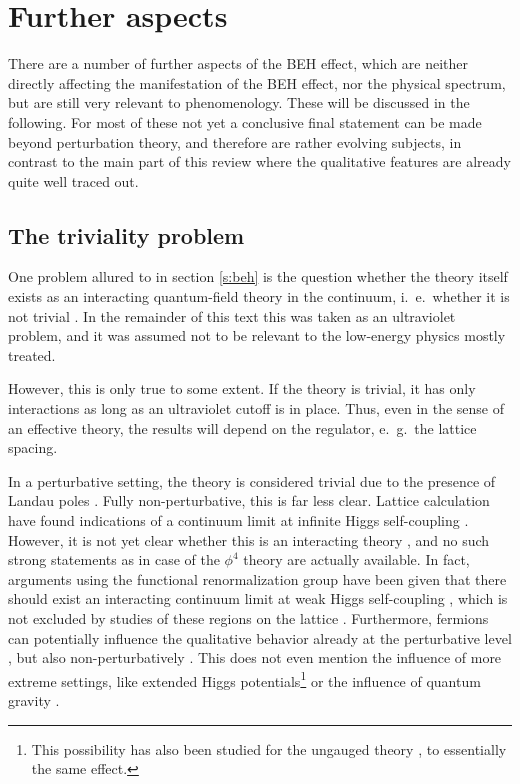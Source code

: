 \documentclass[final,twoside,12pt]{article}
\newcommand*{\1}{1\!\!\!\bot}
\begin{document}
\section{Further aspects}\label{s:further}

There are a number of further aspects of the BEH effect, which are neither directly affecting the manifestation of the BEH effect, nor the physical spectrum, but are still very relevant to phenomenology. These will be discussed in the following. For most of these not yet a conclusive final statement can be made beyond perturbation theory, and therefore are rather evolving subjects, in contrast to the main part of this review where the qualitative features are already quite well traced out.

\subsection{The triviality problem}\label{ss:triv}

One problem allured to in section \ref{s:beh} is the question whether the theory itself exists as an interacting quantum-field theory in the continuum, i.\ e.\ whether it is not trivial \cite{Callaway:1988ya}. In the remainder of this text this was taken as an ultraviolet problem, and it was assumed not to be relevant to the low-energy physics mostly treated.

However, this is only true to some extent. If the theory is trivial, it has only interactions as long as an ultraviolet cutoff is in place. Thus, even in the sense of an effective theory, the results will depend on the regulator, e.\ g.\ the lattice spacing.

In a perturbative setting, the theory is considered trivial due to the presence of Landau poles \cite{Callaway:1988ya}. Fully non-perturbative, this is far less clear. Lattice calculation have found indications of a continuum limit at infinite Higgs self-coupling \cite{Bonati:2009pf}. However, it is not yet clear whether this is an interacting theory \cite{Dashen:1983ts,Fernandez:1992jh}, and no such strong statements as in case of the $\phi^4$ theory \cite{Luscher:1987ay,Luscher:1987ek,Hasenfratz:1988kr,Luscher:1988gc,Luscher:1988uq,Zimmermann:1991xx,Heller:1993yv} are actually available. In fact, arguments using the functional renormalization group have been given that there should exist an interacting continuum limit at weak Higgs self-coupling \cite{Gies:2015lia,Gies:2016kkk,Gies:2019nij}, which is not excluded by studies of these regions on the lattice \cite{Wurtz:2013ova,Maas:2014pba}. Furthermore, fermions can potentially influence the qualitative behavior already at the perturbative level \cite{Callaway:1988ya,Litim:2014uca,Litim:2015iea,Bezrukov:2012sa}, but also non-perturbatively \cite{Gies:2013pma}. This does not even mention the influence of more extreme settings, like extended Higgs potentials\footnote{This possibility has also been studied for the ungauged theory \cite{Gies:2014xha,Chu:2015nha,Borchardt:2016xju}, to essentially the same effect.} \cite{Gies:2017zwf} or the influence of quantum gravity \cite{Dona:2013qba,Eichhorn:2016esv,Eichhorn:2017ylw,Gonzalez-Martin:2017bvw}.
\end{document}
